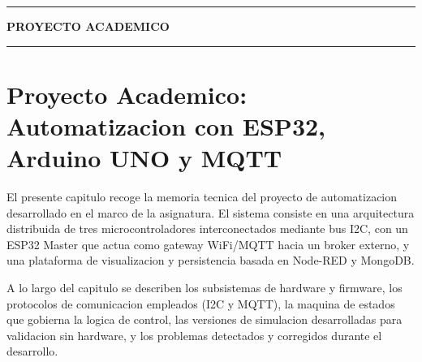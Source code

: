 

{\centering\noindent\rule{\textwidth}{1pt}\par}

\begin{center}
\Large\textbf{PROYECTO ACADEMICO}
\end{center}

{\centering\noindent\rule{\textwidth}{1pt}\par}

\vspace{0.5cm}

\begin{center}
\end{center}

\vspace{0.5cm}

\chapter{Proyecto Academico: Automatizacion con ESP32, Arduino UNO y MQTT}

El presente capitulo recoge la memoria tecnica del proyecto de automatizacion desarrollado en el marco de la asignatura. El sistema consiste en una arquitectura distribuida de tres microcontroladores interconectados mediante bus I2C, con un ESP32 Master que actua como gateway WiFi/MQTT hacia un broker externo, y una plataforma de visualizacion y persistencia basada en Node-RED y MongoDB.

A lo largo del capitulo se describen los subsistemas de hardware y firmware, los protocolos de comunicacion empleados (I2C y MQTT), la maquina de estados que gobierna la logica de control, las versiones de simulacion desarrolladas para validacion sin hardware, y los problemas detectados y corregidos durante el desarrollo.


